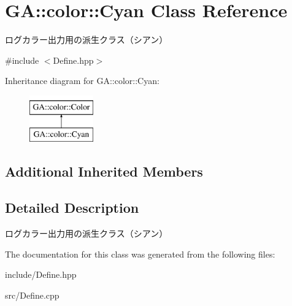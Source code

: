 \hypertarget{class_g_a_1_1color_1_1_cyan}{}\section{GA\+::color\+::Cyan Class Reference}
\label{class_g_a_1_1color_1_1_cyan}


ログカラー出力用の派生クラス（シアン）  




{\ttfamily \#include $<$Define.\+hpp$>$}

Inheritance diagram for GA\+::color\+::Cyan\+:\begin{figure}[H]
\begin{center}
\leavevmode
\includegraphics[height=2.000000cm]{class_g_a_1_1color_1_1_cyan}
\end{center}
\end{figure}
\subsection*{Additional Inherited Members}


\subsection{Detailed Description}
ログカラー出力用の派生クラス（シアン） 



The documentation for this class was generated from the following files\+:\begin{DoxyCompactItemize}
\item 
include/Define.\+hpp\item 
src/Define.\+cpp\end{DoxyCompactItemize}
